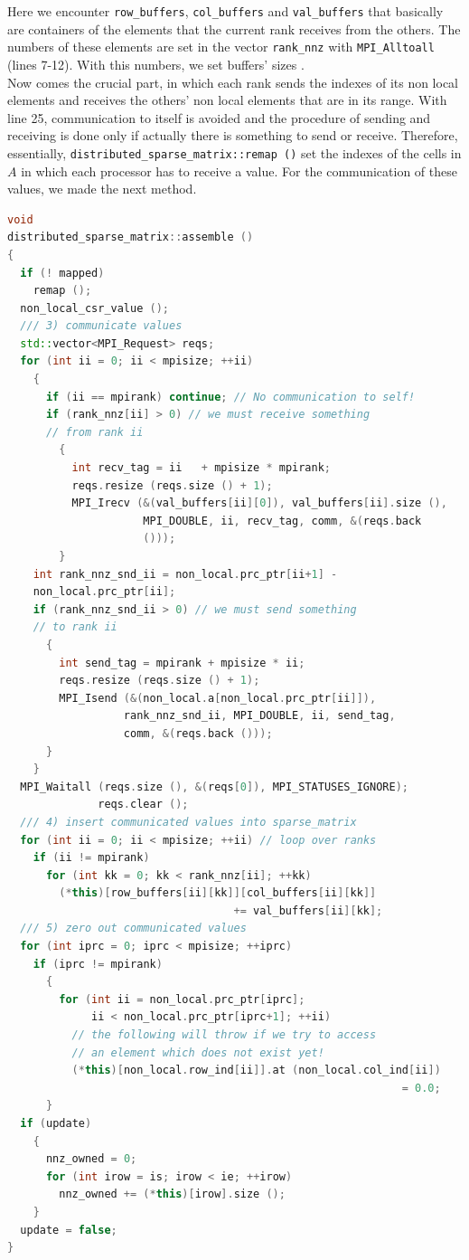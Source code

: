 Here we encounter \texttt{row\_buffers}, \texttt{col\_buffers} and \texttt{val\_buffers} that basically are containers of the elements that the current rank receives from the others. The numbers of these elements are set in the vector \texttt{rank\_nnz} with \texttt{MPI\_Alltoall} (lines 7-12). With this numbers, we set buffers' sizes . \\
Now comes the crucial part, in which each rank sends the indexes of its non local elements and receives the others' non local elements that are in its range. With line 25, communication to itself is avoided and the procedure of sending and receiving is done only if actually there is something to send or receive. Therefore, essentially, \texttt{distributed\_sparse\_matrix::remap ()} set the indexes of the cells in $ A $ in which each processor has to receive a value. For the communication of these values, we made the next method.
\begin{lstlisting}[language=C++, caption={distributed\_sparse\_matrix::assemble ()}]
void
distributed_sparse_matrix::assemble ()
{
  if (! mapped)
    remap ();
  non_local_csr_value ();
  /// 3) communicate values
  std::vector<MPI_Request> reqs;
  for (int ii = 0; ii < mpisize; ++ii)
	{
	  if (ii == mpirank) continue; // No communication to self!
	  if (rank_nnz[ii] > 0) // we must receive something 
	  // from rank ii
	    {
          int recv_tag = ii   + mpisize * mpirank;
          reqs.resize (reqs.size () + 1);
		  MPI_Irecv (&(val_buffers[ii][0]), val_buffers[ii].size (),
                     MPI_DOUBLE, ii, recv_tag, comm, &(reqs.back
                     ()));
        }
    int rank_nnz_snd_ii = non_local.prc_ptr[ii+1] -
    non_local.prc_ptr[ii];      
    if (rank_nnz_snd_ii > 0) // we must send something 
    // to rank ii
      {
	    int send_tag = mpirank + mpisize * ii;
	    reqs.resize (reqs.size () + 1);
	    MPI_Isend (&(non_local.a[non_local.prc_ptr[ii]]),
		    	  rank_nnz_snd_ii, MPI_DOUBLE, ii, send_tag,
				  comm, &(reqs.back ()));
      }     
    }
  MPI_Waitall (reqs.size (), &(reqs[0]), MPI_STATUSES_IGNORE);
              reqs.clear ();
  /// 4) insert communicated values into sparse_matrix
  for (int ii = 0; ii < mpisize; ++ii) // loop over ranks
    if (ii != mpirank)
      for (int kk = 0; kk < rank_nnz[ii]; ++kk)  
        (*this)[row_buffers[ii][kk]][col_buffers[ii][kk]]
                                   += val_buffers[ii][kk];
  /// 5) zero out communicated values  
  for (int iprc = 0; iprc < mpisize; ++iprc)
    if (iprc != mpirank)
	  {
		for (int ii = non_local.prc_ptr[iprc];
		     ii < non_local.prc_ptr[iprc+1]; ++ii)
		  // the following will throw if we try to access
		  // an element which does not exist yet!
		  (*this)[non_local.row_ind[ii]].at (non_local.col_ind[ii])
                                                             = 0.0;
      }
  if (update)
    {
      nnz_owned = 0;
	  for (int irow = is; irow < ie; ++irow)
	    nnz_owned += (*this)[irow].size ();
	}
  update = false;
}
\end{lstlisting}
